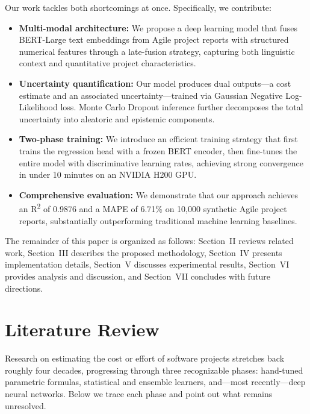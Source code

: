 \documentclass[conference]{IEEEtran}
\begin{document}
Our work tackles both shortcomings at once. Specifically, we contribute:

\begin{itemize}
    \item \textbf{Multi-modal architecture:} We propose a deep learning model that fuses BERT-Large text embeddings from Agile project reports with structured numerical features through a late-fusion strategy, capturing both linguistic context and quantitative project characteristics.
    \item \textbf{Uncertainty quantification:} Our model produces dual outputs---a cost estimate and an associated uncertainty---trained via Gaussian Negative Log-Likelihood loss. Monte Carlo Dropout inference further decomposes the total uncertainty into aleatoric and epistemic components.
    \item \textbf{Two-phase training:} We introduce an efficient training strategy that first trains the regression head with a frozen BERT encoder, then fine-tunes the entire model with discriminative learning rates, achieving strong convergence in under 10 minutes on an NVIDIA H200 GPU.
    \item \textbf{Comprehensive evaluation:} We demonstrate that our approach achieves an R\textsuperscript{2} of 0.9876 and a MAPE of 6.71\% on 10,000 synthetic Agile project reports, substantially outperforming traditional machine learning baselines.
\end{itemize}

The remainder of this paper is organized as follows: Section~II reviews related work, Section~III describes the proposed methodology, Section~IV presents implementation details, Section~V discusses experimental results, Section~VI provides analysis and discussion, and Section~VII concludes with future directions.

\section{Literature Review}

Research on estimating the cost or effort of software projects stretches back roughly four decades, progressing through three recognizable phases: hand-tuned parametric formulas, statistical and ensemble learners, and---most recently---deep neural networks. Below we trace each phase and point out what remains unresolved.
\end{document}
